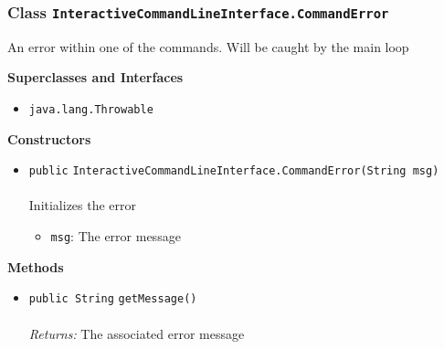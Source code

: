 \subsubsection{Class \lstinline|InteractiveCommandLineInterface.CommandError|}
An error within one of the commands. Will be caught by the main loop \\
\noindent\begin{minipage}[t]{5cm}
\vspace{0.3em}
\hspace*{2em}
\vspace{0.3em}
\end{minipage}



\textbf{\sffamily Superclasses and Interfaces}
\begin{itemize}
\item \lstinline|java.lang.Throwable|
\end{itemize}


\textbf{\sffamily Constructors}
\begin{itemize}
\item \lstinline|public| \lstinline|InteractiveCommandLineInterface.CommandError|\lstinline|(String msg)|\\ \\[-0.6em]
Initializes the error
\begin{itemize}
\item \lstinline|msg|: The error message
\end{itemize}



\end{itemize}


\textbf{\sffamily Methods}
\begin{itemize}
\item \lstinline|public String| \lstinline|getMessage|\lstinline|()|\\ \\[-0.6em]
\emph{Returns:} The associated error message



\end{itemize}



